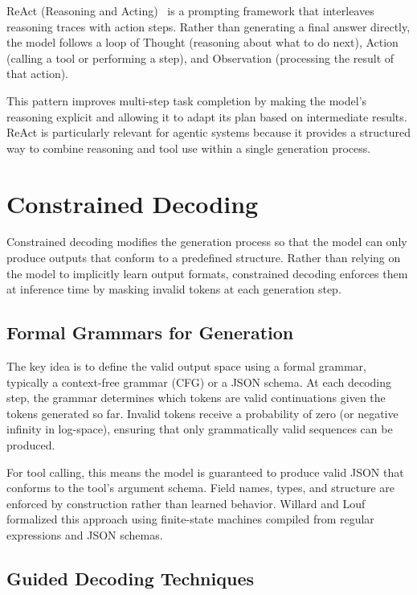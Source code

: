 ReAct (Reasoning and Acting)~\cite{yao2023react} is a prompting framework that interleaves reasoning traces with action steps. Rather than generating a final answer directly, the model follows a loop of Thought (reasoning about what to do next), Action (calling a tool or performing a step), and Observation (processing the result of that action).

This pattern improves multi-step task completion by making the model's reasoning explicit and allowing it to adapt its plan based on intermediate results. ReAct is particularly relevant for agentic systems because it provides a structured way to combine reasoning and tool use within a single generation process.

\section{Constrained Decoding}

Constrained decoding modifies the generation process so that the model can only produce outputs that conform to a predefined structure. Rather than relying on the model to implicitly learn output formats, constrained decoding enforces them at inference time by masking invalid tokens at each generation step.

\subsection{Formal Grammars for Generation}

The key idea is to define the valid output space using a formal grammar, typically a context-free grammar (CFG) or a JSON schema. At each decoding step, the grammar determines which tokens are valid continuations given the tokens generated so far. Invalid tokens receive a probability of zero (or negative infinity in log-space), ensuring that only grammatically valid sequences can be produced.

For tool calling, this means the model is guaranteed to produce valid JSON that conforms to the tool's argument schema. Field names, types, and structure are enforced by construction rather than learned behavior. Willard and Louf~\cite{willard2023efficient} formalized this approach using finite-state machines compiled from regular expressions and JSON schemas.

\subsection{Guided Decoding Techniques}


